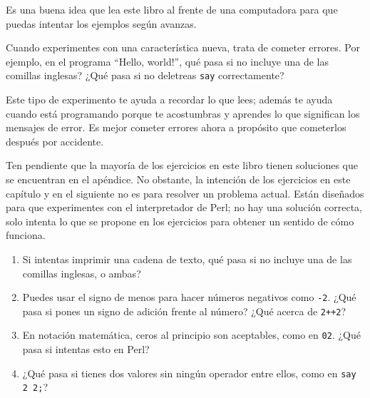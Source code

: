 \begin{exercise}

Es una buena idea que lea este libro al frente de una computadora
para que puedas intentar los ejemplos según avanzas. 

Cuando experimentes con una característica nueva, 
trata de cometer errores. Por ejemplo, en el programa ``Hello, world!'',
qué pasa si no incluye una de las comillas inglesas? ¿Qué pasa si no
deletreas {\tt say} correctamente?

Este tipo de experimento te ayuda a recordar lo que lees; además
te ayuda cuando está programando porque te acostumbras y aprendes
lo que significan los mensajes de error. Es mejor cometer errores
ahora a propósito que cometerlos después por accidente.

Ten pendiente que la mayoría de los ejercicios en este libro
tienen soluciones que se encuentran en el apéndice. No obstante, 
la intención de los ejercicios en este capítulo y en el siguiente 
no es para resolver un problema actual. Están diseñados para que 
experimentes con el interpretador de Perl; no hay una solución correcta, 
solo intenta lo que se propone en los ejercicios para 
obtener un sentido de cómo funciona.

\begin{enumerate}

\item Si intentas imprimir una cadena de texto, qué pasa si no incluye 
una de las comillas inglesas, o ambas?

\item Puedes usar el signo de menos para hacer números negativos como 
{\tt -2}. ¿Qué pasa si pones un signo de adición frente al número?
¿Qué acerca de {\tt 2++2}?

\item En notación matemática, ceros al principio son aceptables, como en 
{\tt 02}. ¿Qué pasa si intentas esto en Perl?

\item ¿Qué pasa si tienes dos valores sin ningún operador entre ellos,
como en {\tt say 2 2;}?

\end{enumerate}

\end{exercise}




